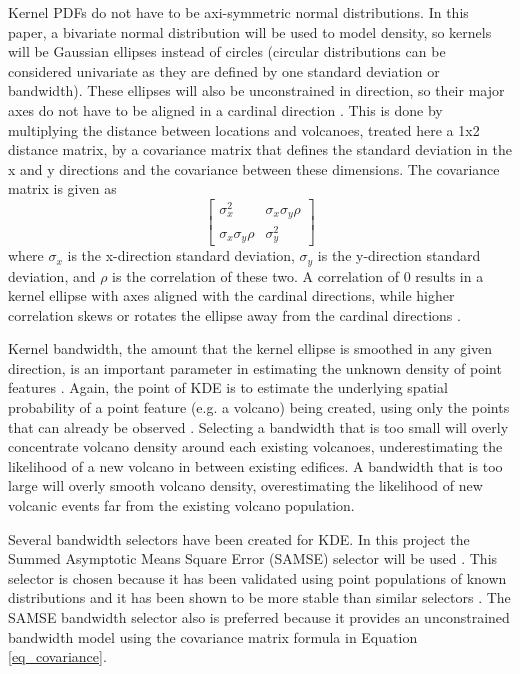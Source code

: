 Kernel PDFs do not have to be axi-symmetric normal distributions. In this paper, a bivariate normal distribution will be used to model density, so kernels will be Gaussian ellipses instead of circles (circular distributions can be considered univariate as they are defined by one standard deviation or bandwidth). These ellipses will also be unconstrained in direction, so their major axes do not have to be aligned in a cardinal direction \citep{wand1993comparison}. This is done by multiplying the distance between locations and volcanoes, treated here a 1x2 distance matrix, by a covariance matrix that defines the standard deviation in the x and y directions and the covariance between these dimensions. The covariance matrix is given as
\begin{equation}\begin{bmatrix}
\sigma_x^2 & \sigma_x\sigma_y\rho\\
\sigma_x\sigma_y\rho & \sigma_y^2
\label{eq_covariance}
\end{bmatrix}\end{equation}
where $\sigma_x$ is the x-direction standard deviation, $\sigma_y$ is the y-direction standard deviation, and $\rho$ is the correlation of these two. A correlation of 0 results in a kernel ellipse with axes aligned with the cardinal directions, while higher correlation skews or rotates the ellipse away from the cardinal directions \citep{wand1993comparison}.

Kernel bandwidth, the amount that the kernel ellipse is smoothed in any given direction, is an important parameter in estimating the unknown density of point features \citep{lutz1995improved,connor2015probabilistic}. Again, the point of KDE is to estimate the underlying spatial probability of a point feature (e.g. a volcano) being created, using only the points that can already be observed \citep{connor2000geologic}. Selecting a bandwidth that is too small will overly concentrate volcano density around each existing volcanoes, underestimating the likelihood of a new volcano in between existing edifices. A bandwidth that is too large will overly smooth volcano density, overestimating the likelihood of new volcanic events far from the existing volcano population.

Several bandwidth selectors have been created for KDE. In this project the Summed Asymptotic Means Square Error (SAMSE) selector will be used \citep{duong2007}. This selector is chosen because it has been validated using point populations of known distributions and it has been shown to be more stable than similar selectors \citep{duong2003}. The SAMSE bandwidth selector also is preferred because it provides an unconstrained bandwidth model using the covariance matrix formula in Equation \ref{eq_covariance}.

